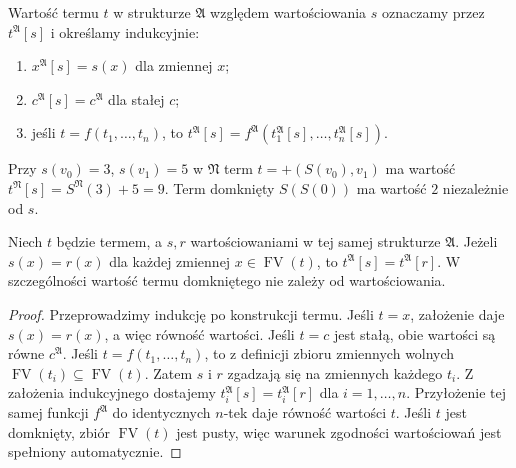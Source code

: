 \begin{definicja}\label{def:sem-term-value}
Wartość termu $t$ w strukturze $\mathfrak A$ względem wartościowania $s$
oznaczamy przez $t^{\mathfrak A}[s]$ i określamy indukcyjnie:
\begin{enumerate}[label=(\roman*)]
\item $x^{\mathfrak A}[s]=s(x)$ dla zmiennej $x$;
\item $c^{\mathfrak A}[s]=c^{\mathfrak A}$ dla stałej $c$;
\item jeśli $t=f(t_1,\ldots,t_n)$, to
      $t^{\mathfrak A}[s]=f^{\mathfrak A}(t_1^{\mathfrak A}[s],\ldots,t_n^{\mathfrak A}[s])$.
\end{enumerate}
\end{definicja}
\begin{przyklad}
Przy $s(v_0)=3$, $s(v_1)=5$ w $\mathfrak N$ term
$t=+(S(v_0),v_1)$ ma wartość
$t^{\mathfrak N}[s]=S^{\mathfrak N}(3)+5=9$.
Term domknięty $S(S(0))$ ma wartość $2$ niezależnie od $s$.
\end{przyklad}

\begin{lemat}\label{lem:sem-term-coincidence}
Niech $t$ będzie termem, a $s,r$ wartościowaniami w tej samej
strukturze $\mathfrak A$. Jeżeli $s(x)=r(x)$ dla każdej zmiennej
$x\in\operatorname{FV}(t)$, to
$t^{\mathfrak A}[s]=t^{\mathfrak A}[r]$.
W szczególności wartość termu domkniętego nie zależy od wartościowania.
\end{lemat}
\begin{proof}
Przeprowadzimy indukcję po konstrukcji termu. Jeśli $t=x$,
założenie daje $s(x)=r(x)$, a więc równość wartości. Jeśli $t=c$
jest stałą, obie wartości są równe $c^{\mathfrak A}$.
Jeśli $t=f(t_1,\ldots,t_n)$, to z definicji zbioru zmiennych
wolnych $\operatorname{FV}(t_i)\subseteq\operatorname{FV}(t)$.
Zatem $s$ i $r$ zgadzają się na zmiennych każdego $t_i$.
Z założenia indukcyjnego dostajemy
$t_i^{\mathfrak A}[s]=t_i^{\mathfrak A}[r]$ dla $i=1,\ldots,n$.
Przyłożenie tej samej funkcji $f^{\mathfrak A}$ do identycznych
$n$-tek daje równość wartości $t$.
Jeśli $t$ jest domknięty, zbiór $\operatorname{FV}(t)$ jest pusty,
więc warunek zgodności wartościowań jest spełniony automatycznie.
\end{proof}

